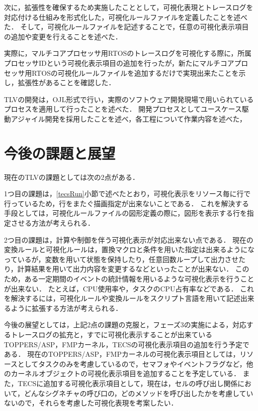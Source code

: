次に，拡張性を確保するため実施したこととして，可視化表現とトレースログを対応付ける仕組みを形式化した，可視化ルールファイルを定義したことを述べた．
そして，可視化ルールファイルを記述することで，任意の可視化表示項目の追加や変更を行えることを述べた．

実際に，マルチコアプロセッサ用RTOSのトレースログを可視化する際に，所属プロセッサIDという可視化表示項目の追加を行ったが，新たにマルチコアプロセッサ用RTOSの可視化ルールファイルを追加するだけで実現出来たことを示し，拡張性があることを確認した．

TLVの開発は，OJL形式で行い，実際のソフトウェア開発現場で用いられているプロセスを適用して行ったことを述べた．
開発プロセスとしてユースケース駆動アジャイル開発を採用したことを述べ，各工程について作業内容を述べた，

\section{今後の課題と展望}

現在のTLVの課題としては次の2点がある．

1つ目の課題は，\ref{tecsRun}小節で述べたとおり，可視化表示をリソース毎に行で行っているため，行をまたぐ描画指定が出来ないことである．
これを解決する手段としては，可視化ルールファイルの図形定義の際に，図形を表示する行を指定させる方法が考えられる．

2つ目の課題は，計算や制御を伴う可視化表示が対応出来ない点である．
現在の変換ルールと可視化ルールは，置換マクロと条件を用いた指定は出来るようになっているが，変数を用いて状態を保持したり，任意回数ループして出力させたり，計算結果を用いて出力内容を変更するなどといったことが出来ない．
このため，ある一定期間のイベントの統計情報を用いるような可視化表示を行うことが出来ない．
たとえば，CPU使用率や，タスクのCPU占有率などである．
これを解決するには，可視化ルールや変換ルールをスクリプト言語を用いて記述出来るように拡張する方法が考えられる．

今後の展望としては，上記2点の課題の克服と，フェーズ3の実施による，対応するトレースログの拡充と，すでに可視化表示することが出来ているTOPPERS/ASP，FMPカーネル，TECSの可視化表示項目の追加を行う予定である．
現在のTOPPERS/ASP，FMPカーネルの可視化表示項目としては，リソースとしてタスクのみを考慮しているので，セマフォやイベントフラグなど，他のカーネルオブジェクトの可視化表示項目を追加することを予定している．
また，TECSに追加する可視化表示項目として，現在は，セルの呼び出し関係において，どんなシグネチャの呼び口の，どのメソッドを呼び出したかを考慮していないので，それらを考慮した可視化表現を考案したい．
